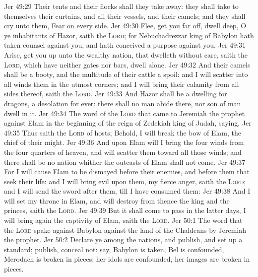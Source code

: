 \vs Jer 49:29 Their tents and their flocks shall they take away: they shall take to themselves their curtains, and all their vessels, and their camels; and they shall cry unto them, Fear  on every side.
\vs Jer 49:30 Flee, get you far off, dwell deep, O ye inhabitants of Hazor, saith the \textsc{Lord}; for Nebuchadrezzar king of Babylon hath taken counsel against you, and hath conceived a purpose against you.
\vs Jer 49:31 Arise, get you up unto the wealthy nation, that dwelleth without care, saith the \textsc{Lord}, which have neither gates nor bars,  dwell alone.
\vs Jer 49:32 And their camels shall be a booty, and the multitude of their cattle a spoil: and I will scatter into all winds them  in the utmost corners; and I will bring their calamity from all sides thereof, saith the \textsc{Lord}.
\vs Jer 49:33 And Hazor shall be a dwelling for dragons,  a desolation for ever: there shall no man abide there, nor  son of man dwell in it.
\vs Jer 49:34 The word of the \textsc{Lord} that came to Jeremiah the prophet against Elam in the beginning of the reign of Zedekiah king of Judah, saying,
\vs Jer 49:35 Thus saith the \textsc{Lord} of hosts; Behold, I will break the bow of Elam, the chief of their might.
\vs Jer 49:36 And upon Elam will I bring the four winds from the four quarters of heaven, and will scatter them toward all those winds; and there shall be no nation whither the outcasts of Elam shall not come.
\vs Jer 49:37 For I will cause Elam to be dismayed before their enemies, and before them that seek their life: and I will bring evil upon them,  my fierce anger, saith the \textsc{Lord}; and I will send the sword after them, till I have consumed them:
\vs Jer 49:38 And I will set my throne in Elam, and will destroy from thence the king and the princes, saith the \textsc{Lord}.
\vs Jer 49:39 But it shall come to pass in the latter days,  I will bring again the captivity of Elam, saith the \textsc{Lord}.
\vs Jer 50:1 The word that the \textsc{Lord} spake against Babylon  against the land of the Chaldeans by Jeremiah the prophet.
\vs Jer 50:2 Declare ye among the nations, and publish, and set up a standard; publish,  conceal not: say, Babylon is taken, Bel is confounded, Merodach is broken in pieces; her idols are confounded, her images are broken in pieces.
